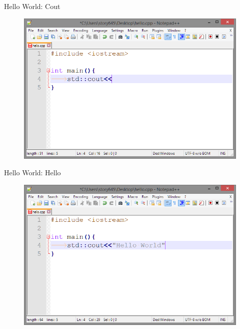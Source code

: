 \documentclass[xcolor={dvipsnames}]{beamer}
\begin{document}
\begin{frame}{Hello World: Cout}
	\begin{figure}
			\includegraphics[width=1\textwidth]{cout}
	\end{figure}
\end{frame}

\begin{frame}{Hello World: Hello}
	\begin{figure}
			\includegraphics[width=1\textwidth]{hello}
	\end{figure}
\end{frame}
\end{document}
